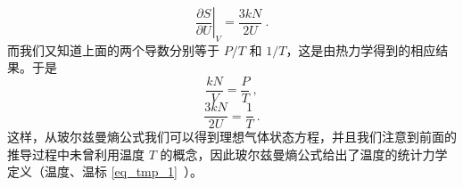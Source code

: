 \begin{equation}
\left. \frac{\partial S}{\partial U}\right |_{V}^{}=\frac{3kN}{2U}~.
\end{equation}
而我们又知道上面的两个导数分别等于 $P/T$ 和 $1/T$，这是由热力学得到的相应结果。于是
\begin{equation}
\dfrac{kN}{V}=\dfrac{P}{T}~,
\end{equation}
\begin{equation}
\dfrac{3kN}{2U} = \dfrac{1}{T}~.
\end{equation}
这样，从玻尔兹曼熵公式我们可以得到理想气体状态方程，并且我们注意到前面的推导过程中未曾利用温度 $T$ 的概念，因此玻尔兹曼熵公式给出了温度的统计力学定义（温度、温标 \autoref{eq_tmp_1}~）。